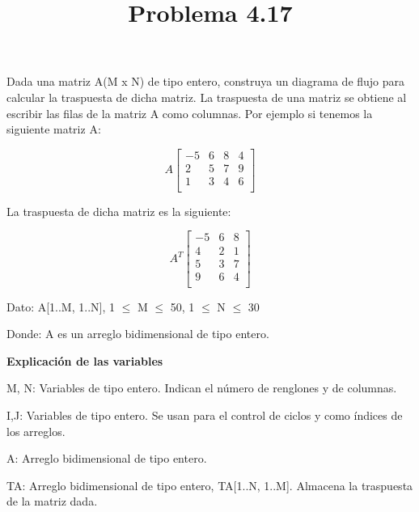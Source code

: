 \documentclass[11pt]{amsart}
\title{Problema 4.17}
\begin{document}
\maketitle
\noindent Dada una matriz A(M x N) de tipo entero, construya un diagrama de flujo para
calcular la traspuesta de dicha matriz. La traspuesta de una matriz se obtiene al
escribir las filas de la matriz A como columnas. Por ejemplo si tenemos la siguiente matriz A:
\newline

\[A
\begin{bmatrix}
-5 & 6 & 8 & 4 \\
2 & 5 & 7 & 9 \\
1 & 3 & 4 & 6 \\
\end{bmatrix}
\]
\newline

La traspuesta de dicha matriz es la siguiente:
\newline

\[A^{T}
\begin{bmatrix}
-5 & 6 & 8 \\
4 & 2 & 1 \\
5 & 3 & 7 \\
9 & 6 & 4 \\
\end{bmatrix}
\]
\newline

\noindent Dato: A[1..M, 1..N], 1 $\leq$ M $\leq$ 50, 1 $\leq$ N $\leq$ 30
\newline

\noindent Donde: A es un arreglo bidimensional de tipo entero.
\newline


\noindent\textbf{Explicación de las variables}
\newline

\noindent  M, N: Variables de tipo entero. Indican el número de renglones y de columnas.

\noindent  I,J: Variables de tipo entero. Se usan para el control de ciclos y como índices de los arreglos.

\noindent  A: Arreglo bidimensional de tipo entero.

\noindent  TA: Arreglo bidimensional de tipo entero, TA[1..N, 1..M]. Almacena la traspuesta de la matriz dada.
\end{document}
